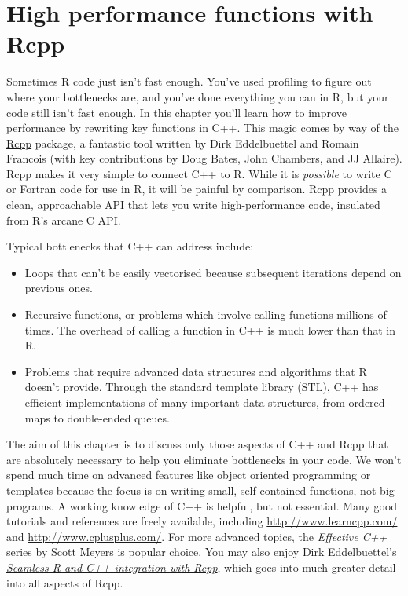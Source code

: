 \chapter{High performance functions with Rcpp}\label{rcpp}

Sometimes R code just isn't fast enough. You've used profiling to figure
out where your bottlenecks are, and you've done everything you can in R,
but your code still isn't fast enough. In this chapter you'll learn how
to improve performance by rewriting key functions in C++. This magic
comes by way of the \href{http://www.rcpp.org/}{Rcpp} package, a
fantastic tool written by Dirk Eddelbuettel and Romain Francois (with
key contributions by Doug Bates, John Chambers, and JJ Allaire). Rcpp
makes it very simple to connect C++ to R. While it is \emph{possible} to
write C or Fortran code for use in R, it will be painful by comparison.
Rcpp provides a clean, approachable API that lets you write
high-performance code, insulated from R's arcane C API. 

Typical bottlenecks that C++ can address include:

\begin{itemize}
\item
  Loops that can't be easily vectorised because subsequent iterations
  depend on previous ones.
\item
  Recursive functions, or problems which involve calling functions
  millions of times. The overhead of calling a function in C++ is much
  lower than that in R.
\item
  Problems that require advanced data structures and algorithms that R
  doesn't provide. Through the standard template library (STL), C++ has
  efficient implementations of many important data structures, from
  ordered maps to double-ended queues.
\end{itemize}

The aim of this chapter is to discuss only those aspects of C++ and Rcpp
that are absolutely necessary to help you eliminate bottlenecks in your
code. We won't spend much time on advanced features like object oriented
programming or templates because the focus is on writing small,
self-contained functions, not big programs. A working knowledge of C++
is helpful, but not essential. Many good tutorials and references are
freely available, including \url{http://www.learncpp.com/} and
\url{http://www.cplusplus.com/}. For more advanced topics, the
\emph{Effective C++} series by Scott Meyers is popular choice. You may
also enjoy Dirk Eddelbuettel's
\href{http://www.springer.com/statistics/computational+statistics/book/978-1-4614-6867-7}{\emph{Seamless
R and C++ integration with Rcpp}}, which goes into much greater detail
into all aspects of Rcpp.

